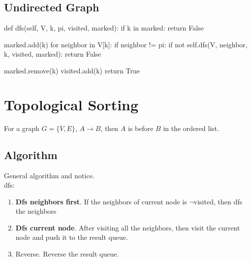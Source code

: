\subsection{Undirected Graph}
\begin{python}
def dfs(self, V, k, pi, visited, marked):
    if k in marked:
        return False

    marked.add(k)
    for neighbor in V[k]:
        if neighbor != pi:
            if not self.dfs(V, neighbor, k, 
                visited, marked):
                return False

    marked.remove(k)
    visited.add(k)
    return True
\end{python}
\section{Topological Sorting}
For a graph $G=\{V, E\}$, $ A \rightarrow B $, then $A$ is before $B$ in the ordered list. 
\subsection{Algorithm}
General algorithm and notice.\\
 
dfs:
\begin{enumerate}
\item \textbf{Dfs neighbors first}. If the neighbors of current node is  $\neg$visited, then dfs the neighbors
\item \textbf{Dfs current node}. After visiting all the neighbors, then visit the current node and push it to the result queue.
\item Reverse. Reverse the result queue. 
\end{enumerate}

